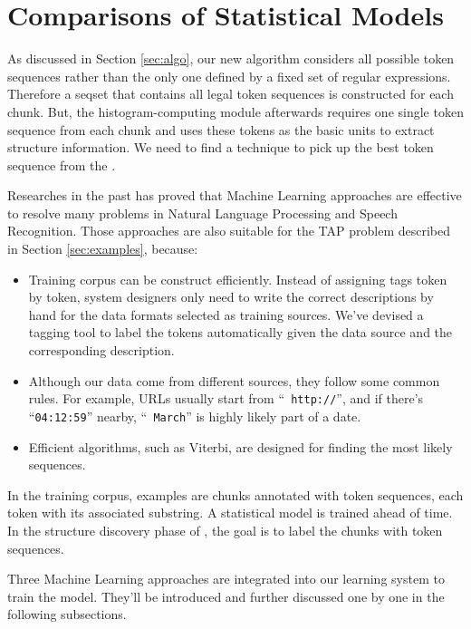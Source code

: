 

\section{Comparisons of Statistical Models}\label{sec:stats}

As discussed in Section \ref{sec:algo}, our new algorithm considers all possible
token sequences rather than the only one defined by a fixed set of
regular expressions. Therefore a seqset that contains all legal token
sequences is constructed for each chunk. But, the histogram-computing
module afterwards requires one single token sequence from each chunk
and uses these tokens as the basic units to extract structure
information. We need to find a technique to pick up the best token
sequence from the \seqset.

Researches in the past has proved that Machine Learning approaches
are effective to resolve many problems in Natural Language
Processing and Speech Recognition. Those approaches are also
suitable for the TAP problem described in Section
\ref{sec:examples}, because:


\begin{itemize}
\item Training corpus can be construct efficiently. Instead of
assigning tags token by token, system designers
only need to write the correct descriptions by hand for the data
formats selected as training sources. We've devised a tagging tool to
label the tokens automatically given the data source and the
corresponding description.
\item Although our data come from different sources, they follow some
common rules. For example, URLs usually start from ``{\tt
http://}'', and if there's ``{\tt 04:12:59}'' nearby, ``{\tt
March}'' is highly likely part of a date.
\item Efficient algorithms, such as Viterbi, are designed for finding
the most likely sequences.
\end{itemize}

In the training corpus, examples are chunks annotated with token
sequences, each token with its associated substring. A statistical
model is trained ahead of time. In the structure discovery phase of
\learnpads{}, the goal is to label the chunks with token sequences.

Three Machine Learning approaches are integrated into our learning
system to train the model. They'll be introduced and further discussed
one by one in the following subsections.

